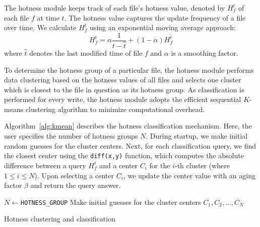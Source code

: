 The hotness module keeps track of each file's hotness value, denoted by
$H_{f}^{t}$ of each file $f$ at time $t$.  The hotness value captures the
update frequency of a file over time. 
We calculate $H_{f}^{t}$ using an exponential moving average approach:
$$
H_{f}^{t} = \alpha\frac{1}{t-\hat{t}} + (1-\alpha)H_{f}^{\hat{t}}
$$
where $\hat{t}$ denotes the last modified time of file $f$ and 
$\alpha$ is a smoothing factor.

To determine the hotness group of a particular file, the hotness module 
performs data clustering based on the hotness values of all files and selects
one cluster which is closest to the file in question as its hotness group. As
classification is performed for every write, the hotness module adopts the
efficient sequential $K$-means clustering algorithm \cite{macqueen67} to
minimize computational overhead.

Algorithm~\ref{alg:kmean} describes the hotness classification mechanism.
Here, the user specifies the number of hotness groups $N$.  During startup, we
make initial random guesses for the cluster centers.  Next, for each
classification query, we find the closest center using the \texttt{diff(x,y)}
function, which computes the absolute difference between a query $H_{f}^{t}$
and a center $C_{i}$ for the $i$-th cluster (where $1\le i\le N$).  Upon
selecting a center $C_i$, we update the center value with an aging factor
$\beta$ and return the query answer.


\begin{algorithm}[t]
    \small
    \DontPrintSemicolon
    $N \gets $\verb|HOTNESS_GROUP|\;
    Make initial guesses for the cluster centers $C_{1}, C_{2},...,C_{N}$ \;
    \caption{Hotness clustering and classification}
    \label{alg:kmean}
\end{algorithm}

